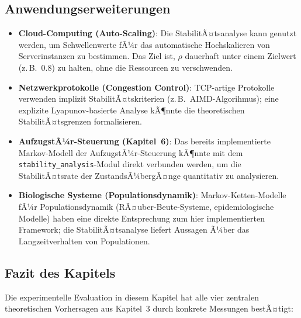 ﻿\documentclass[a4paper,12pt]{report}
\theoremstyle{definition}
\begin{document}
\subsection{Anwendungserweiterungen}

\begin{itemize}
	\item \textbf{Cloud-Computing (Auto-Scaling)}: Die StabilitÃ¤ts\-analyse
	kann genutzt werden, um Schwellenwerte fÃ¼r das automatische
	Hochskalieren von Serverinstanzen zu bestimmen.  Das
	Ziel ist, $\rho$ dauerhaft unter einem Zielwert
	(z.\,B.\ 0.8) zu halten, ohne die Ressourcen zu
	verschwenden.
	
	\item \textbf{Netzwerkprotokolle (Congestion Control)}: TCP-artige
	Protokolle verwenden implizit StabilitÃ¤tskriterien (z.\,B.\ 
	AIMD-Algorihmus); eine explizite Lyapunov-basierte Analyse
	kÃ¶nnte die theoretischen StabilitÃ¤tsgrenzen formalisieren.
	
	\item \textbf{AufzugstÃ¼r-Steuerung (Kapitel~6)}: Das bereits
	implementierte Markov-Modell der AufzugstÃ¼r-Steuerung
	kÃ¶nnte mit dem \texttt{stability\_analysis}-Modul
	direkt verbunden werden, um die StabilitÃ¤tsrate der
	ZustandsÃ¼bergÃ¤nge quantitativ zu analysieren.
	
	\item \textbf{Biologische Systeme (Populationsdynamik)}:
	Markov-Ketten-Modelle fÃ¼r Populationsdynamik
	(RÃ¤uber-Beute-Systeme, epidemiologische Modelle) haben
	eine direkte Entsprechung zum hier implementierten Framework;
	die StabilitÃ¤tsanalyse liefert Aussagen Ã¼ber das
	Langzeitverhalten von Populationen.
\end{itemize}

\subsection{Fazit des Kapitels}
\label{subsec:fazit-kap8}

Die experimentelle Evaluation in diesem Kapitel hat alle vier
zentralen theoretischen Vorhersagen aus Kapitel~3 durch konkrete
Messungen bestÃ¤tigt:
\end{document}
